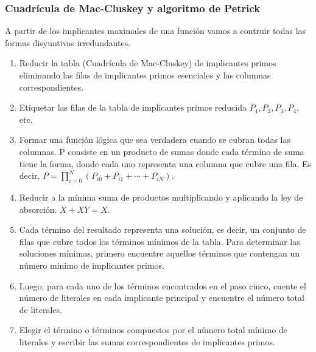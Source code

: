 \subsubsection{Cuadrícula de Mac-Cluskey y algoritmo de Petrick}
A partir de los implicantes maximales de una función vamos a contruir todas las formas disyuntivas irredundantes.
\begin{enumerate}
    \item Reducir la tabla (Cuadrícula de Mac-Cluskey) de implicantes primos eliminando las filas de implicantes primos esenciales y las columnas correspondientes.
    \item Etiquetar las filas de la tabla de implicantes primos reducida $P_ {1}, P_ {2}, P_ {3}, P_ {4}$, etc.
    \item Formar una función lógica que sea verdadera cuando se cubran todas las columnas. P consiste en un producto de sumas donde cada término de suma tiene la forma, donde cada uno representa una columna que cubre una fila. Es decir, $P = \prod_{i=0}^N(P _ {{i0}} + P _ {{i1}} +\cdots + P _ {{iN}})$.
    \item Reducir a la mínima suma de productos multiplicando y aplicando la ley de absorción. $X + XY = X$.
    \item Cada término del resultado representa una solución, es decir, un conjunto de filas que cubre todos los términos mínimos de la tabla. Para determinar las soluciones mínimas, primero encuentre aquellos términos que contengan un número mínimo de implicantes primos.
    \item Luego, para cada uno de los términos encontrados en el paso cinco, cuente el número de literales en cada implicante principal y encuentre el número total de literales.
    \item Elegir el término o términos compuestos por el número total mínimo de literales y escribir las sumas correspondientes de implicantes primos.
\end{enumerate}
